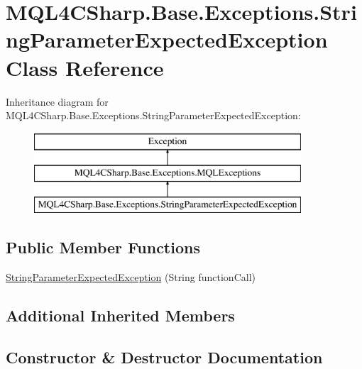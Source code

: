 \hypertarget{class_m_q_l4_c_sharp_1_1_base_1_1_exceptions_1_1_string_parameter_expected_exception}{}\section{M\+Q\+L4\+C\+Sharp.\+Base.\+Exceptions.\+String\+Parameter\+Expected\+Exception Class Reference}
\label{class_m_q_l4_c_sharp_1_1_base_1_1_exceptions_1_1_string_parameter_expected_exception}
Inheritance diagram for M\+Q\+L4\+C\+Sharp.\+Base.\+Exceptions.\+String\+Parameter\+Expected\+Exception\+:\begin{figure}[H]
\begin{center}
\leavevmode
\includegraphics[height=3.000000cm]{class_m_q_l4_c_sharp_1_1_base_1_1_exceptions_1_1_string_parameter_expected_exception}
\end{center}
\end{figure}
\subsection*{Public Member Functions}
\begin{DoxyCompactItemize}
\item 
\hyperlink{class_m_q_l4_c_sharp_1_1_base_1_1_exceptions_1_1_string_parameter_expected_exception_aee1b3d5cbb9325c287d4c3a4e4232035}{String\+Parameter\+Expected\+Exception} (String function\+Call)
\end{DoxyCompactItemize}
\subsection*{Additional Inherited Members}


\subsection{Constructor \& Destructor Documentation}
